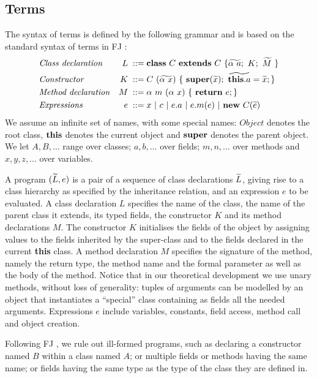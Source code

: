 \subsection{Terms}
\label{sec:terms}
The syntax of terms is defined by the following grammar and is based on the standard syntax of terms in FJ \cite{featherweight}:
\begin{align*}
     & \mbox{\textit{Class declaration}}  & L \; ::= \; & \syndecl{C}{C}{\wt{\alpha \ a};\ K; \ \wt{M}\ }                         \\
     & \mbox{\textit{Constructor}}        & K \;::=\;   & C\ (\wt{\alpha\ x})\ \{\ \synsuper(\wt{x});\ \wt{\synthis.a}=\wt{x}; \} \\
     & \mbox{\textit{Method declaration}} & M \; ::= \; & \alpha \ m\ (\alpha \ x)\ \{\ \synret e; \}                             \\
     & \mbox{\textit{Expressions}}        & e \; ::=\;  & x\ |\  c\ |\ e.a\ |\ e.m(e) \ | \ \synnew C(\wt{e})
\end{align*}
We assume an infinite set of names, with some special names:
$\mathit{Object}$ denotes the root class, $\mathbf{this}$ denotes the current object and $\mathbf{super}$ denotes the parent object.
We let  $A, B,\ldots$ range over classes; $a, b,\ldots$ over fields; $m, n,\ldots$ over methods and $x, y, z, \ldots$ over variables.

A {program} $(\widetilde{L}, e)$ is a pair of a sequence of class declarations $\widetilde{L}$, giving rise to a class hierarchy as specified by the inheritance relation, and an expression $e$ to be evaluated.
%
A class declaration $L$ specifies the name of the class, the name of the parent class it extends, its typed fields, the constructor $K$ and its method declarations $M$.
The constructor $K$ initialises the fields of the object by assigning values to the fields inherited by the super-class and to the fields declared in the current \textbf{this} class.
%
A method declaration $M$ specifies the signature of the method, namely the return type, the method name and the formal parameter as well as the body of the method.
Notice that in our theoretical development we use unary methods, without loss of generality: tuples of arguments can be modelled by an object that instantiates a ``special'' class containing as fields all the needed arguments.
Expressions $e$ include variables, constants, field access, method call and object creation.



Following FJ \cite{featherweight}, we rule out ill-formed programs, such as declaring a constructor named $B$ within a class named $A$; or multiple fields or methods having the same name; or fields having the same type as the type of the class they are defined in.


